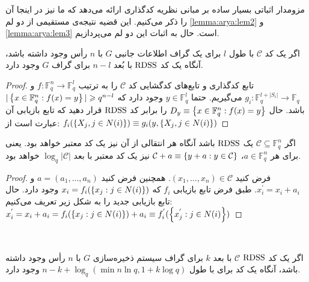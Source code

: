  مزومدار اثباتی بسیار ساده بر مبانی نظریه کدگذاری ارائه می‌دهد که ما نیز در اینجا آن را ذکر می‌کنیم. این قضیه نتیجه‌ی مستقیمی از دو لم
 \autoref{lemma:arya:lem2}
 و
 \autoref{lemma:arya:lem3}
  است. حال به اثبات این دو لم می‌پردازیم.
 \begin{lemma}
 	\label{lemma:arya:lem2}
 	اگر یک کد
 	$\mathcal{C}$
 	با طول
 	$l$
 	برای یک گراف اطلاعات جانبی
 	$G$
 	با
 	$n$
 	رأس وجود داشته باشد، آنگاه یک کد
 	$\mathrm{RDSS}$
 	با بُعد
 	$n - l$
 	برای گراف
 	$G$
 	وجود دارد.
 \end{lemma}
 \begin{proof}
 	تابع کدگذاری و تابع‌های کدگشایی کد
 	$\mathcal{C}$
 	را به ترتیب
 	$f: \mathbb{F}_q^n \rightarrow \mathbb{F}_q^l$
 	و
 	$g_i: \mathbb{F}_q^{l + |S_i|} \rightarrow \mathbb{F}_q$
 	می‌گیریم. حتما
 	$y \in \mathbb{F}_q^{l}$
 	وجود دارد که
 	$|\left\{ x \in \mathbb{F}_q^n: f(x) = y \right\}| \geqslant q^{n - l}$
 	باشد. حال
 	$D_y \equiv \left\{ x \in \mathbb{F}_q^n: f(x) = y \right\}$
  	را برابر کد
 	$\mathrm{RDSS}$
 	قرار دهید که تابع بازیابی آن عبارت است از:
 	$f_i(\left\{ X_j, j \in N(i) \right\}) \equiv g_i(y, \left\{ X_j, j \in N(i) \right\})$
 \end{proof}
 \begin{lemma}
 	\label{lemma:arya:lem4}
 	اگر
 	$\mathcal{C} \subseteq \mathbb{F}_q^n$
 	یک
 	$\mathrm{RDSS}$
 	باشد آنگاه هر انتقالی از آن نیز یک کد معتبر خواهد بود. یعنی برای هر
 	$a \in \mathbb{F}_q^n$،
 	$\mathcal{C} + a \equiv \left\{ y + a: y \in \mathcal{C} \right\}$
 	نیز یک کد معتبر با بعد
 	$\log_q |\mathcal{C}|$
 	خواهد بود.
 \end{lemma}
 \begin{proof}
 	فرض کنید
 	$(x_1, \ldots, x_n) \in \mathcal{C}$.
 	همچنین فرض کنید
 	$a = (a_1, \dots,  a_n)$
 	و
 	$x_i^{'} = x_i + a_i$.
 	طبق فرض تابع بازیابی
 	$f_i$
 	که
 	$x_i = f_i(\left\{ x_j: j \in N(i) \right\})$
 	وجود دارد. حال تابع بازیابی جدید را به شکل زیر تعریف می‌کنیم:
 	$x_i^{'} = x_i +a_i = f_i(\left\{ x_j: j \in N(i) \right\}) + a_i \equiv f_i^{'}(\left\{ x_j^{'}: j \in N(i) \right\})$
 \end{proof}
 ‍\begin{lemma}
 	\label{lemma:arya:lem3}
 	اگر یک کد
 	$\mathrm{RDSS}$ $\mathcal{C}$
 	با بعد
 	$k$
 	برای گراف سیستم ذخیره‌سازی
 	$G$
 	با
 	$n$
 	رأس وجود داشته باشد، آنگاه یک کد برای
 	\icodg
 	با طول 
 	$n - k + \log_q(\min{n \ln q, 1 + k \log q})$
 	وجود دارد.
 \end{lemma}
